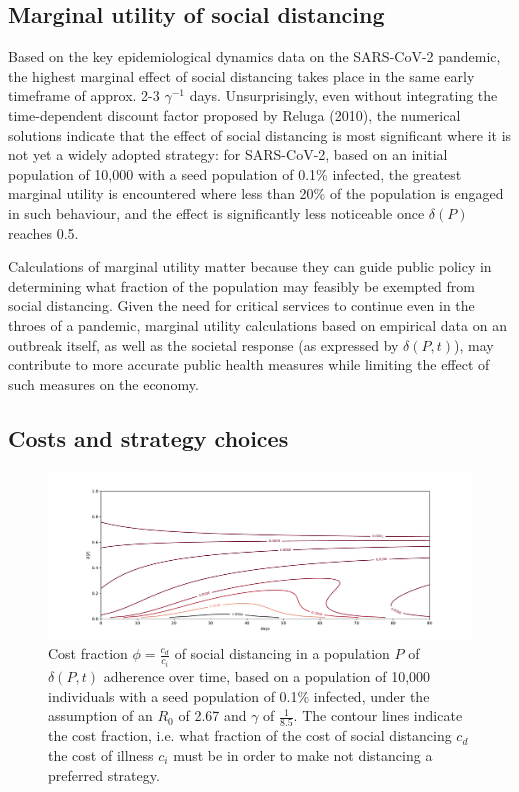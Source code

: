 \documentclass{article}
\begin{document}

\subsection{Marginal utility of social distancing} %
\label{sub:marginal_utility_of_social_distancing}

Based on the key epidemiological dynamics data on the SARS-CoV-2 pandemic, the highest marginal effect of social distancing takes place in the same early timeframe of approx. 2-3 $\gamma^{-1}$ days. Unsurprisingly, even without integrating the time-dependent discount factor proposed by Reluga (2010), the numerical solutions indicate that the effect of social distancing is most significant where it is not yet a widely adopted strategy: for SARS-CoV-2, based on an initial population of 10,000 with a seed population of 0.1\% infected, the greatest marginal utility is encountered where less than 20\% of the population is engaged in such behaviour, and the effect is significantly less noticeable once $\delta(P)$ reaches 0.5.

Calculations of marginal utility matter because they can guide public policy in determining what fraction of the population may feasibly be exempted from social distancing. Given the need for critical services to continue even in the throes of a pandemic, marginal utility calculations based on empirical data on an outbreak itself, as well as the societal response (as expressed by $\delta(P, t)$), may contribute to more accurate public health measures while limiting the effect of such measures on the economy. 


\subsection{Costs and strategy choices} %
\label{sub:costs_and_strategy_choices}


\begin{figure}
	\includegraphics[width=\linewidth]{figures/cost_fraction}
	\caption{Cost fraction $\phi = \frac{c_d}{c_i}$ of social distancing in a population $P$ of $\delta(P, t)$ adherence over time, based on a population of 10,000 individuals with a seed population of 0.1\% infected, under the assumption of an $R_0$ of 2.67 and $\gamma$ of $\frac{1}{8.5}$. The contour lines indicate the cost fraction, i.e. what fraction of the cost of social distancing $c_d$ the cost of illness $c_i$ must be in order to make not distancing a preferred strategy.}
	\label{fig:cost_fraction}
\end{figure}
\end{document}
